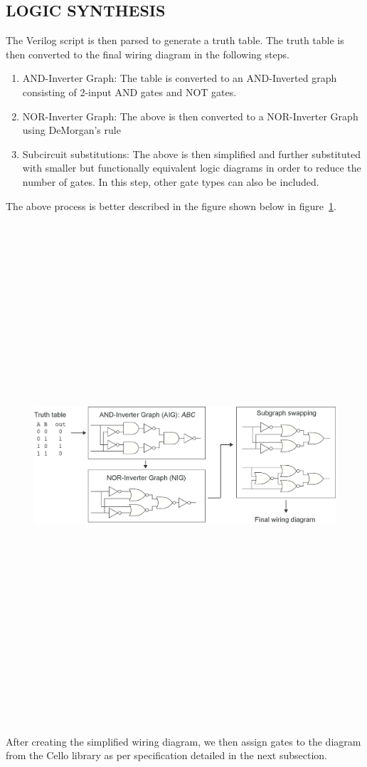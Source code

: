 \documentclass[11pt]{article}
\begin{document}
\subsection*{LOGIC SYNTHESIS}
The Verilog script is then parsed to generate a truth table. The truth table is then converted to the final wiring diagram in the following steps.
\begin{enumerate}
\item AND-Inverter Graph:
The table is converted to an AND-Inverted graph consisting of 2-input AND gates and NOT gates.
\item NOR-Inverter Graph:
The above is then converted to a NOR-Inverter Graph using DeMorgan's rule
\item Subcircuit substitutions:
The above is then simplified and further substituted with smaller but functionally equivalent logic diagrams in order to reduce the number of gates. In this step, other gate types can also be included.\cite{Cidarlab}
\end{enumerate}
The above process is better described in the figure shown below in figure~\ref{Logic Synthesis}.
\begin{figure}[ht!]
\centering
\includegraphics[width=18cm,height=18cm,keepaspectratio]{logic.png}
\label{Logic Synthesis}
\end{figure}
\\[\baselineskip]    
After creating the simplified wiring diagram, we then assign gates to the diagram from the Cello library as per specification detailed in the next subsection.
\end{document}
